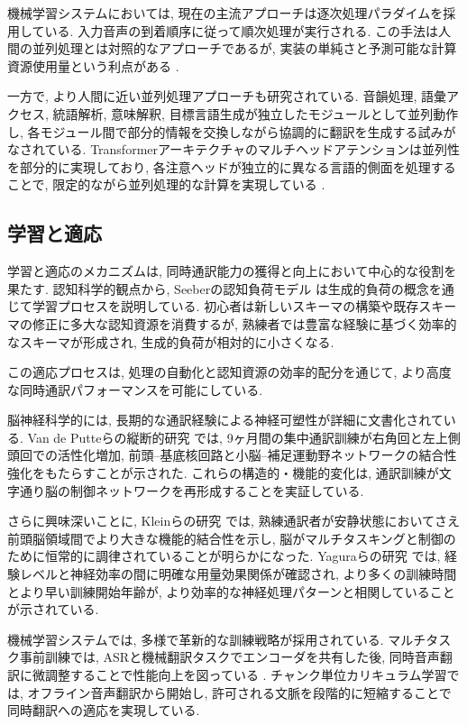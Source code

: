 機械学習システムにおいては, 現在の主流アプローチは逐次処理パラダイムを採用している.
入力音声の到着順序に従って順次処理が実行される.
この手法は人間の並列処理とは対照的なアプローチであるが, 実装の単純さと予測可能な計算資源使用量という利点がある \cite{liu2024recent}.

一方で, より人間に近い並列処理アプローチも研究されている.
音韻処理, 語彙アクセス, 統語解析, 意味解釈, 目標言語生成が独立したモジュールとして並列動作し, 各モジュール間で部分的情報を交換しながら協調的に翻訳を生成する試みがなされている.
Transformerアーキテクチャのマルチヘッドアテンションは並列性を部分的に実現しており, 各注意ヘッドが独立的に異なる言語的側面を処理することで, 限定的ながら並列処理的な計算を実現している \cite{ma2020monotonic}.

\subsection{学習と適応}

学習と適応のメカニズムは, 同時通訳能力の獲得と向上において中心的な役割を果たす.
認知科学的観点から, Seeberの認知負荷モデル \cite{seeber2011cognitive} は生成的負荷の概念を通じて学習プロセスを説明している.
初心者は新しいスキーマの構築や既存スキーマの修正に多大な認知資源を消費するが, 熟練者では豊富な経験に基づく効率的なスキーマが形成され, 生成的負荷が相対的に小さくなる.

この適応プロセスは, 処理の自動化と認知資源の効率的配分を通じて, より高度な同時通訳パフォーマンスを可能にしている.

脳神経科学的には, 長期的な通訳経験による神経可塑性が詳細に文書化されている.
Van de Putteらの縦断的研究 \cite{vandeputte2018anatomical} では, 9ヶ月間の集中通訳訓練が右角回と左上側頭回での活性化増加, 前頭--基底核回路と小脳--補足運動野ネットワークの結合性強化をもたらすことが示された.
これらの構造的・機能的変化は, 通訳訓練が文字通り脳の制御ネットワークを再形成することを実証している.

さらに興味深いことに, Kleinらの研究 \cite{klein2018interpreter} では, 熟練通訳者が安静状態においてさえ前頭脳領域間でより大きな機能的結合性を示し, 脳がマルチタスキングと制御のために恒常的に調律されていることが明らかになった.
Yaguraらの研究 \cite{yagura2021selective} では, 経験レベルと神経効率の間に明確な用量効果関係が確認され, より多くの訓練時間とより早い訓練開始年齢が, より効率的な神経処理パターンと相関していることが示されている.

機械学習システムでは, 多様で革新的な訓練戦略が採用されている.
マルチタスク事前訓練では, ASRと機械翻訳タスクでエンコーダを共有した後, 同時音声翻訳に微調整することで性能向上を図っている \cite{ko2024naist}.
チャンク単位カリキュラム学習では, オフライン音声翻訳から開始し, 許可される文脈を段階的に短縮することで同時翻訳への適応を実現している.

